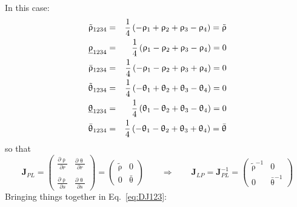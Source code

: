 In this case:
\begin{eqnarray}
\tilde{\uprho}_{1234}       &=&\frac14\left( -\uprho_1 +\uprho_2 + \uprho_3 -\uprho_4\right) = \tilde{\uprho}\nonumber\\
\underline{\uprho}_{1234}   &=&\frac14\left(  \uprho_1 -\uprho_2 + \uprho_3 -\uprho_4\right) =0\nonumber\\
\bar{\uprho}_{1234}         &=&\frac14\left( -\uprho_1 -\uprho_2 + \uprho_3 +\uprho_4\right) =  0 \nonumber\\
\tilde{\uptheta}_{1234}     &=&\frac14\left( -\uptheta_1 +\uptheta_2 + \uptheta_3 -\uptheta_4 \right) =0\nonumber\\
\underline{\uptheta}_{1234} &=&\frac14\left(  \uptheta_1 -\uptheta_2 + \uptheta_3 -\uptheta_4 \right)=0\nonumber\\
\bar{\uptheta}_{1234}       &=&\frac14\left( -\uptheta_1 -\uptheta_2 + \uptheta_3 +\uptheta_4 \right)= \bar{\uptheta}
\end{eqnarray}
so that 
\[
{\bm J}_{PL}=
\left(
\begin{array}{cc}
\frac{\partial \uprho}{\partial r} & \frac{\partial \uptheta}{\partial r} \\ \\
\frac{\partial \uprho}{\partial s} & \frac{\partial \uptheta}{\partial s} 
\end{array}
\right)
=
\left(
\begin{array}{cc}
\tilde{\uprho} & 0 \\
0 & \bar{\uptheta}
\end{array}
\right)
\qquad 
\Rightarrow
\qquad
{\bm J}_{LP}={\bm J}_{PL}^{-1} 
=
\left(
\begin{array}{cc}
\tilde{\uprho}^{-1}& 0 \\
0 & \bar{\uptheta} ^{-1}
\end{array}
\right)
\]
Bringing things together in Eq.~\eqref{eq:DJ123}:
